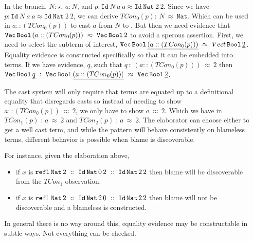 In the branch, $N:\star$, $a:N$, and $p:\mathtt{Id}\ N\ a\ a\approx\mathtt{Id}\ \mathtt{Nat}\ 2\ 2$.
Since we have $p:\mathtt{Id}\ N\ a\ a\approx\mathtt{Id}\ \mathtt{Nat}\ 2\ 2$, we can derive $TCon_0(p):\ N\ \approx\ \mathtt{Nat}$.
Which can be used in $a::(TCon_0(p))$ to cast $a$ from $N$ to \Nat{}.
But then we need evidence that $\mathtt{Vec}{}\, \mathtt{Bool}{}\, (a :: (TCon_0(p)))\ \approx\ \mathtt{Vec}{}\, \mathtt{Bool}{}\, 2$ to avoid a sperous assertion.
First, we need to select the subterm of interest, $\mathtt{Vec}{}\, \mathtt{Bool}{}\, \underline{(a :: (TCon_0(p)))}\ \approx\ Vect{}\, \mathtt{Bool}{}\, \underline{2}$.
Equality evidence is constructed specifically so that it can be embedded into terms.
If we have evidence, $q$, such that $q\ :\ (a ::(TCon_0(p)))\ \approx\ 2$ then $\Vect{}\, \Bool{}\, \underline{q}\ :\ \Vect{}\, \Bool{}\, \underline{(a :: (TCon_0(p)))}\ \approx\ \Vect{}\, \Bool{}\, \underline{2}$.
 
The cast system will only require that terms are equated up to a definitional equality that disregards casts so instead of needing to show $a :: (TCon_0(p))\ \approx\ 2$, we only have to show $a\ \approx\ 2$.
Which we have in $TCon_1(p)\ :\ a\ \approx\ 2$ and $TCon_2(p)\ :\ a\ \approx\ 2$.
The elaborator can choose either to get a well cast term, and while the pattern will behave consistently on blameless terms, different behavior is possible when blame is discoverable.

For instance, given the elaboration above,
 
\begin{itemize}
  \item if $x$ is $\mathtt{refl}\,\Nat{}\,2\ ::\ \Id{}\,\Nat{}\,0\,2\ ::\ \Id{}\,\Nat{}\,2\,2$ then blame will be discoverable from the $TCon_1$ observation.
  \item if $x$ is $\mathtt{refl}\,\Nat{}\,2\ ::\ \Id{}\,\Nat{}\,2\,0\ ::\ \Id{}\,\Nat{}\,2\,2$ then blame will not be discoverable and a blameless \Vect{} is constructed.
\end{itemize}
In general there is no way around this, equality evidence may be constructable in subtle ways.
Not everything can be checked.

